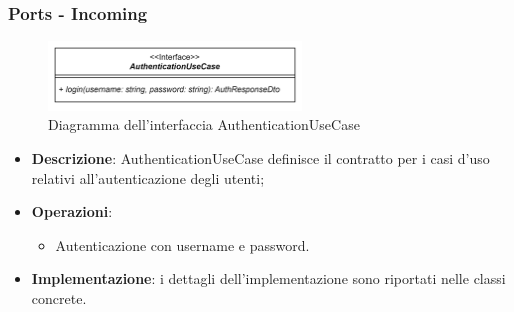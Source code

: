 \subsubsection{Ports - Incoming}

 \label{AuthenticationUseCase}
\begin{figure}[H]
    \centering
    \includegraphics[width=0.6\textwidth]{assets/Backend/authentication_use_case.png}
    \caption{Diagramma dell'interfaccia AuthenticationUseCase}
  \end{figure}
\begin{itemize}
    \item \textbf{Descrizione}: AuthenticationUseCase definisce il contratto per i casi d'uso relativi all'autenticazione degli utenti;
    \item \textbf{Operazioni}:
    \begin{itemize}
        \item Autenticazione con username e password.
    \end{itemize}
    \item \textbf{Implementazione}: i dettagli dell'implementazione sono riportati nelle classi concrete.
\end{itemize}  

